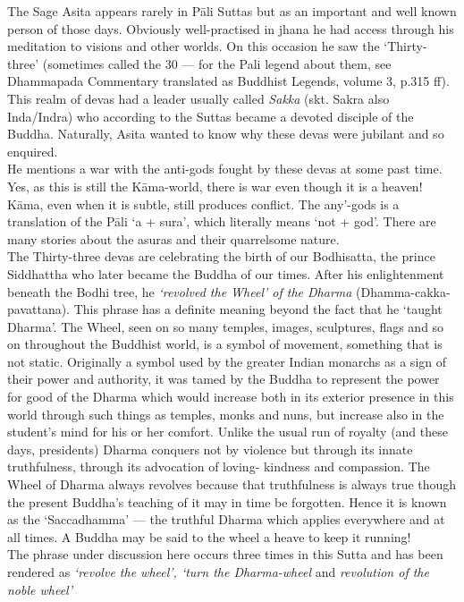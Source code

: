 The Sage Asita appears rarely in P\=ali Suttas but as an important and well known person of those days. Obviously well-practised in jhana he had access through his meditation to visions and other worlds. On this occasion he saw the `Thirty-three' (sometimes called the 30 — for the Pali legend about them, see Dhammapada Commentary translated as Buddhist Legends, volume 3, p.315 ff). This realm of devas had a leader usually called \textit{Sakka} (skt. Sakra also Inda/Indra) who according to the Suttas became a devoted disciple of the Buddha. Naturally, Asita wanted to know why these devas were jubilant and so enquired.\\
 
He mentions a war with the anti-gods fought by these devas at some past time. Yes, as this is still the K\=ama-world, there is war even though it is a heaven! K\=ama, even when it is subtle, still produces conflict. The any'-gods is a translation of the P\=ali `a + sura', which literally means `not + god'. There are many stories about the asuras and their quarrelsome nature.\\


The Thirty-three devas are celebrating the birth of our Bodhisatta, the prince Siddhattha who later became the Buddha of our times. After his enlightenment beneath the Bodhi tree, he \textit{`revolved the Wheel' of the Dharma} (Dhamma-cakka-pavattana). This phrase has a definite meaning beyond the fact that he `taught Dharma'. The Wheel, seen on so many temples, images, sculptures, flags and so on throughout the Buddhist world, is a symbol of movement, something that is not static. Originally a symbol used by the greater Indian monarchs as a sign of their power and authority, it was tamed by the Buddha to represent the power for good of the Dharma which would increase both in its exterior presence in this world through such things as temples, monks and nuns, but increase also in the student's mind for his or her comfort. Unlike the usual run of royalty (and these days, presidents) Dharma conquers not by violence but through its innate truthfulness, through its advocation of loving- kindness and compassion. The Wheel of Dharma always revolves because that truthfulness is always true though the present Buddha's teaching of it may in time be forgotten. Hence it is known as the `Saccadhamma' — the truthful Dharma which applies everywhere and at all times. A Buddha may be said to the wheel a heave to keep it running!\\

The phrase under discussion here occurs three times in this Sutta and has been rendered as \textit{`revolve the wheel', `turn the Dharma-wheel} and \textit{revolution of the noble wheel'}\\


